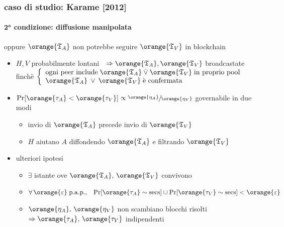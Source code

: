 \begin{frame}
	\frametitle{caso di studio: Karame [2012]}
	\framesubtitle{$\mathbf{2^a}$ \textbf{condizione}: diffusione manipolata}
	
	 \vspace{0.1cm} \newline oppure $\orange{\mathfrak{T}_A}$ non potrebbe seguire $\orange{\mathfrak{T}_V}$ in blockchain
	  		
	\begin{itemize}
	  \item $H$,\,$V$ probabilmente lontani $\;\;\Rightarrow \orange{\mathfrak{T}_A}, \orange{\mathfrak{T}_V}$ broadcastate finchè 
  			$ \left \{
					  \begin{array}{lcr}
					    \text{ogni peer include}\;\orange{\mathfrak{T}_A}\:\dot{\vee}\:\orange{\mathfrak{T}_V}\;\text{in proprio pool}\\
					    \orange{\mathfrak{T}_A}\:\vee\:\orange{\mathfrak{T}_V}\;\text{è confermata}
					  \end{array}
					\right. $ 
	  \item $\Pr[\orange{\tau_A} < \orange{\tau_V}] \propto \sfrac{\orange{\eta_A}}{\orange{\eta_V}}$ governabile in due modi
  		\begin{itemize}
  			\item invio di $\orange{\mathfrak{T}_A}$ precede invio di $\orange{\mathfrak{T}_V}$ 
  			\item $H$ aiutano $A$ diffondendo $\orange{\mathfrak{T}_A}$ e filtrando $\orange{\mathfrak{T}_V}$ 
  		\end{itemize}
	  \item ulteriori ipotesi
	  	\begin{itemize}
	  	  	\item $\exists$ istante ove $\orange{\mathfrak{T}_A},\,\orange{\mathfrak{T}_V}$ convivono
	  	  	\item $\forall\,\orange{\varepsilon}\;\mathrm{p.a.p.},\;\;\;
	  	  			\Pr[\orange{\tau_A}\sim\mathrm{secs}]\cup\Pr[\orange{\tau_V}\sim\mathrm{secs}]<\orange{\varepsilon}$ 
  			\item $\orange{\eta_A},\,\orange{\eta_V}$ non scambiano blocchi risolti $\Rightarrow \orange{\tau_A},\,\orange{\tau_V}$ indipendenti
	  	\end{itemize}
	\end{itemize}
	

\end{frame}
